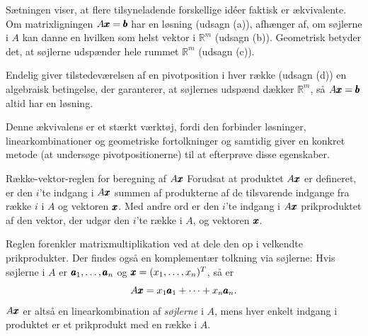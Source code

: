 Sætningen viser, at flere tilsyneladende forskellige idéer faktisk er ækvivalente. Om matrixligningen \( A \pmb{x} = \pmb{b} \) har en løsning (udsagn (a)), afhænger af, om søjlerne i \( A \) kan danne en hvilken som helst vektor i \( \mathbb{R}^m \) (udsagn (b)). Geometrisk betyder det, at søjlerne udspænder hele rummet \( \mathbb{R}^m \) (udsagn (c)).

Endelig giver tilstedeværelsen af en pivotposition i hver række (udsagn (d)) en algebraisk betingelse, der garanterer, at søjlernes udspænd dækker \( \mathbb{R}^m \), så \( A \pmb{x} = \pmb{b} \) altid har en løsning.

Denne ækvivalens er et stærkt værktøj, fordi den forbinder løsninger, linearkombinationer og geometriske fortolkninger og samtidig giver en konkret metode (at undersøge pivotpositionerne) til at efterprøve disse egenskaber.

\begin{custombox}{Række-vektor-reglen for beregning af \( A \pmb{x} \)}
Forudsat at produktet \( A \pmb{x} \) er defineret, er den \( i \)'te indgang i \( A \pmb{x} \) summen af produkterne af de tilsvarende indgange fra række \( i \) i \( A \) og vektoren \( \pmb{x} \). Med andre ord er den \( i \)'te indgang i \( A \pmb{x} \) prikproduktet af den vektor, der udgør den \( i \)'te række i \( A \), og vektoren \( \pmb{x} \).
    
\end{custombox}


Reglen forenkler matrixmultiplikation ved at dele den op i velkendte prikprodukter. Der findes også en komplementær tolkning via søjlerne: Hvis søjlerne i $A$ er $\pmb{a}_1,\ldots,\pmb{a}_n$ og $\pmb{x}=(x_1,\ldots,x_n)^T$, så er
\[
A\pmb{x}=x_1\pmb{a}_1+\cdots+x_n\pmb{a}_n.
\]
$A\pmb{x}$ er altså en linearkombination af \emph{søjlerne} i $A$, mens hver enkelt indgang i produktet er et prikprodukt med en række i $A$.

